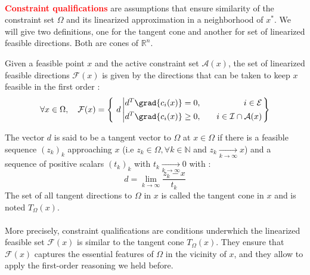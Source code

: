 \documentclass[a4paper]{article}
\begin{document}
{{			\paragraph{} \textbf{\textcolor{red}{Constraint qualifications}} are assumptions that ensure similarity of the constraint set $\Omega$ and its linearized approximation in a neighborhood of $x^*$.  We will give two definitions, one for the tangent cone and another for set of linearized feasible directions. Both are cones of $\mathbb{R}^n$. 
			\vspace{10pt}
			
			{
				Given a feasible point $x$ and the active constraint set $\mathcal{A}(x)$, the set of linearized feasible directions $\mathcal{F}(x)$ is given by the directions that can be taken to keep $x$ feasible in the first order : 
				\begin{equation}
					\forall x\in\Omega, \quad \mathcal{F}(x) = \left\{ \
						d \left\vert 
						\begin{aligned}
							&d^T\grad{c_i(x)} = 0, \quad &i \in\mathcal{E} \\
							&d^T\grad{c_i(x)} \geq 0, \quad &i\in\mathcal{I}\cap \mathcal{A}(x)
						\end{aligned}\right.\right\}
				\end{equation}
			}
	
			\vspace{10pt}
			
			{
				The vector $d$ is said to be a tangent vector to $\Omega$ at $x\in\Omega$ if there is a feasible sequence $(z_k)_k$ approaching $x$ (i.e $z_k\in\Omega, \forall k\in\mathbb{N}$ and $z_k\underset{k\to\infty}{\to} x$) and a sequence of positive scalars $(t_k)_k$ with $t_k\underset{k\to\infty}{\to} 0$ with : 
				\begin{equation}
					d = \lim_{k\to\infty} \frac{z_k-x}{t_k}
				\end{equation}
				The set of all tangent directions to $\Omega$ in $x$ is called the tangent cone in $x$ and is noted $T_\Omega(x)$. 
			}
			
			\paragraph{} More precisely, constraint qualifications are conditions underwhich the linearized feasible set $\mathcal{F}(x)$ is similar to the tangent cone $T_\Omega(x)$. They ensure that $\mathcal{F}(x)$ captures the essential features of $\Omega$ in the vicinity of $x$, and they allow to apply the first-order reasoning we held before. 
			
}}
\end{document}
